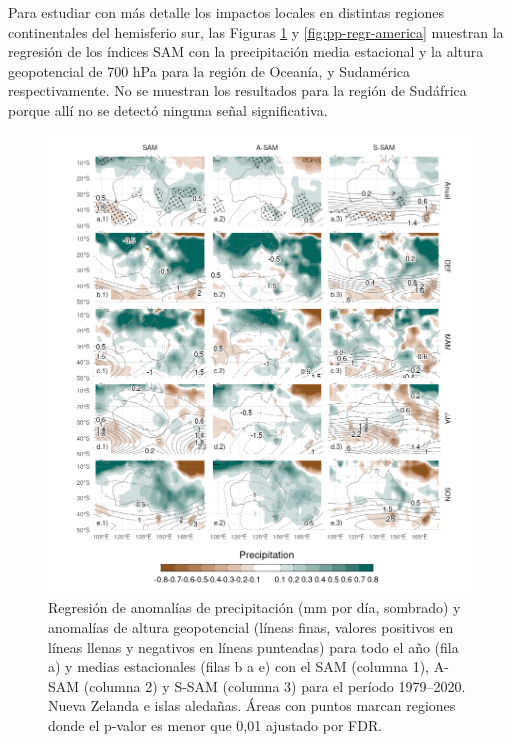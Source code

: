 \documentclass[12pt,oneside,a4paper]{reedthesis}
\begin{document}
Para estudiar con más detalle los impactos locales en distintas regiones continentales del hemisferio sur, las Figuras \ref{fig:pp-regr-oceania} y \ref{fig:pp-regr-america} muestran la regresión de los índices SAM con la precipitación media estacional y la altura geopotencial de 700 hPa para la región de Oceanía, y Sudamérica respectivamente.
No se muestran los resultados para la región de Sudáfrica porque allí no se detectó ninguna señal significativa.



\begin{figure}

{\centering \includegraphics{figures/30-sam/pp-regr-oceania-1} 

}

\caption{Regresión de anomalías de precipitación (mm por día, sombrado) y anomalías de altura geopotencial (líneas finas, valores positivos en líneas llenas y negativos en líneas punteadas) para todo el año (fila a) y medias estacionales (filas b a e) con el SAM (columna 1), A-SAM (columna 2) y S-SAM (columna 3) para el período 1979--2020. Nueva Zelanda e islas aledañas. Áreas con puntos marcan regiones donde el p-valor es menor que 0,01 ajustado por FDR.}\label{fig:pp-regr-oceania}
\end{figure}
\end{document}
